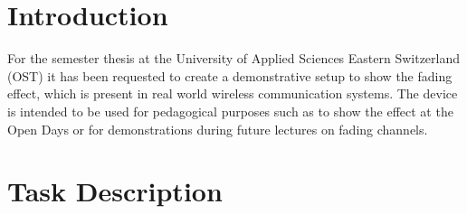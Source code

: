\documentclass[a4paper, twosided, 11pt]{scrartcl}
\begin{document}
\clearpage
\tableofcontents
\listoffigures
\listoftables
\clearpage

\section{Introduction}

For the semester thesis at the University of Applied Sciences Eastern Switzerland (OST) it has been requested to create a demonstrative setup to show the fading effect, which is present in real world wireless communication systems.
The device is intended to be used for pedagogical purposes such as to show the effect at the Open Days or for demonstrations during future lectures on fading channels.

\section{Task Description}
\end{document}
